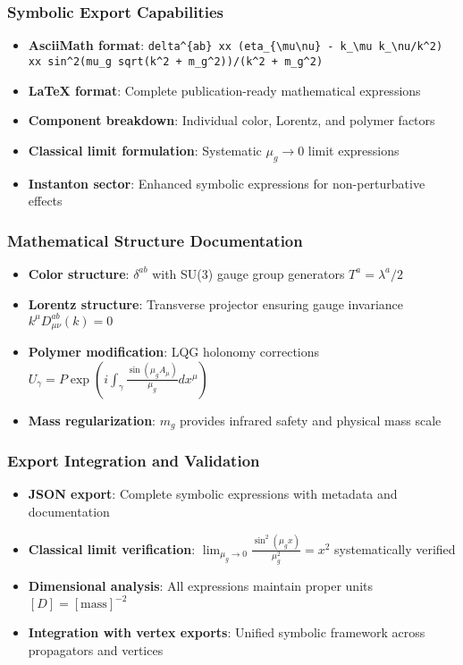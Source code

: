 \documentclass[11pt]{article}
\begin{document}
\subsubsection*{Symbolic Export Capabilities}
\begin{itemize}
  \item \textbf{AsciiMath format}: \texttt{delta\^{}\{ab\} xx (eta\_\{\textbackslash{}mu\textbackslash{}nu\} - k\_\textbackslash{}mu k\_\textbackslash{}nu/k\^{}2) xx sin\^{}2(mu\_g sqrt(k\^{}2 + m\_g\^{}2))/(k\^{}2 + m\_g\^{}2)}
  \item \textbf{LaTeX format}: Complete publication-ready mathematical expressions
  \item \textbf{Component breakdown}: Individual color, Lorentz, and polymer factors
  \item \textbf{Classical limit formulation}: Systematic $\mu_g \to 0$ limit expressions
  \item \textbf{Instanton sector}: Enhanced symbolic expressions for non-perturbative effects
\end{itemize}

\subsubsection*{Mathematical Structure Documentation}
\begin{itemize}
  \item \textbf{Color structure}: $\delta^{ab}$ with SU(3) gauge group generators $T^a = \lambda^a/2$
  \item \textbf{Lorentz structure}: Transverse projector ensuring gauge invariance $k^\mu D^{ab}_{\mu\nu}(k) = 0$
  \item \textbf{Polymer modification}: LQG holonomy corrections $U_\gamma = P \exp(i \int_\gamma \frac{\sin(\mu_g A_\mu)}{\mu_g} dx^\mu)$
  \item \textbf{Mass regularization}: $m_g$ provides infrared safety and physical mass scale
\end{itemize}

\subsubsection*{Export Integration and Validation}
\begin{itemize}
  \item \textbf{JSON export}: Complete symbolic expressions with metadata and documentation
  \item \textbf{Classical limit verification}: $\lim_{\mu_g \to 0} \frac{\sin^2(\mu_g x)}{\mu_g^2} = x^2$ systematically verified
  \item \textbf{Dimensional analysis}: All expressions maintain proper units $[D] = [\text{mass}]^{-2}$
  \item \textbf{Integration with vertex exports}: Unified symbolic framework across propagators and vertices
\end{itemize}
\end{document}
